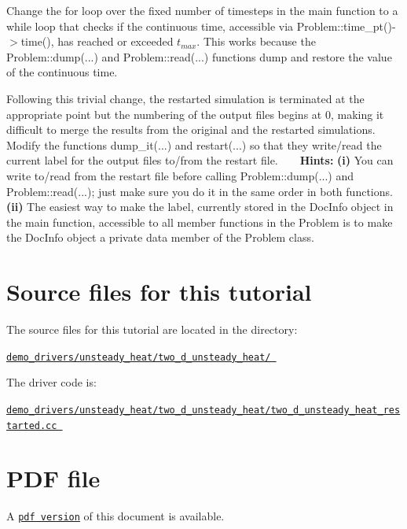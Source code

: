 \begin{DoxyItemize}
\item Change the {\ttfamily for} loop over the fixed number of timesteps in the {\ttfamily main} function to a {\ttfamily while} loop that checks if the continuous time, accessible via {\ttfamily Problem\+::time\+\_\+pt()-\/$>$time()}, has reached or exceeded $ t_{max} $. This works because the {\ttfamily Problem\+::dump}(...) and {\ttfamily Problem\+::read}(...) functions dump and restore the value of the continuous time.
\item Following this trivial change, the restarted simulation is terminated at the appropriate point but the numbering of the output files begins at 0, making it difficult to merge the results from the original and the restarted simulations. Modify the functions {\ttfamily dump\+\_\+it}(...) and {\ttfamily restart}(...) so that they write/read the current label for the output files to/from the restart file. ~\newline
~\newline
 {\bfseries Hints\+:} {\bfseries (i)} You can write to/read from the restart file before calling {\ttfamily Problem\+::dump}(...) and {\ttfamily Problem\+::read}(...); just make sure you do it in the same order in both functions. {\bfseries (ii)} The easiest way to make the label, currently stored in the {\ttfamily Doc\+Info} object in the {\ttfamily main} function, accessible to all member functions in the {\ttfamily Problem} is to make the {\ttfamily Doc\+Info} object a private data member of the {\ttfamily Problem} class.
\end{DoxyItemize}



 

\hypertarget{index_sources}{}\section{Source files for this tutorial}\label{index_sources}

\begin{DoxyItemize}
\item The source files for this tutorial are located in the directory\+: \begin{center} \href{../../../../demo_drivers/unsteady_heat/two_d_unsteady_heat/}{\tt demo\+\_\+drivers/unsteady\+\_\+heat/two\+\_\+d\+\_\+unsteady\+\_\+heat/ } \end{center} 
\item The driver code is\+: \begin{center} \href{../../../../demo_drivers/unsteady_heat/two_d_unsteady_heat/two_d_unsteady_heat_restarted.cc}{\tt demo\+\_\+drivers/unsteady\+\_\+heat/two\+\_\+d\+\_\+unsteady\+\_\+heat/two\+\_\+d\+\_\+unsteady\+\_\+heat\+\_\+restarted.\+cc } \end{center} 
\end{DoxyItemize}



 

 \hypertarget{index_pdf}{}\section{P\+D\+F file}\label{index_pdf}
A \href{../latex/refman.pdf}{\tt pdf version} of this document is available. 
